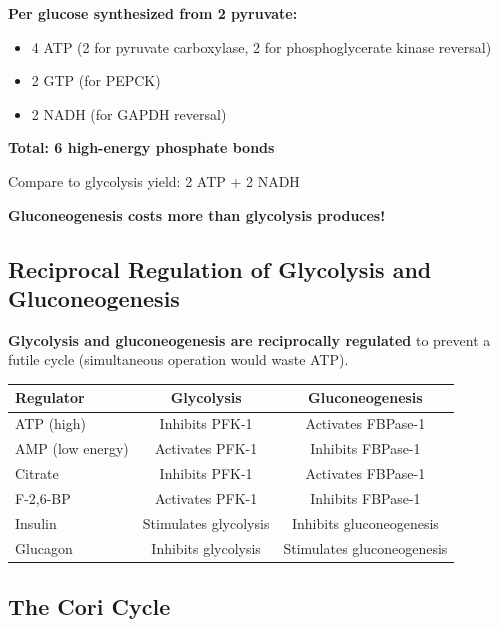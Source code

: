 \begin{center}
\begin{tcolorbox}[colback=red!5, colframe=red!70!black, title=\textbf{Energy Investment for Gluconeogenesis}]
\textbf{Per glucose synthesized from 2 pyruvate:}
\begin{itemize}
    \item 4 ATP (2 for pyruvate carboxylase, 2 for phosphoglycerate kinase reversal)
    \item 2 GTP (for PEPCK)
    \item 2 NADH (for GAPDH reversal)
\end{itemize}
\textbf{Total: 6 high-energy phosphate bonds}

Compare to glycolysis yield: 2 ATP + 2 NADH

\textbf{Gluconeogenesis costs more than glycolysis produces!}
\end{tcolorbox}
\end{center}

\subsection{Reciprocal Regulation of Glycolysis and Gluconeogenesis}

\begin{theorem}
\textbf{Glycolysis and gluconeogenesis are reciprocally regulated} to prevent a futile cycle (simultaneous operation would waste ATP).

\begin{center}
\begin{tabular}{lcc}
\toprule
\textbf{Regulator} & \textbf{Glycolysis} & \textbf{Gluconeogenesis} \\
\midrule
ATP (high) & Inhibits PFK-1 & Activates FBPase-1 \\
AMP (low energy) & Activates PFK-1 & Inhibits FBPase-1 \\
Citrate & Inhibits PFK-1 & Activates FBPase-1 \\
F-2,6-BP & Activates PFK-1 & Inhibits FBPase-1 \\
Insulin & Stimulates glycolysis & Inhibits gluconeogenesis \\
Glucagon & Inhibits glycolysis & Stimulates gluconeogenesis \\
\bottomrule
\end{tabular}
\end{center}
\end{theorem}

\subsection{The Cori Cycle}

